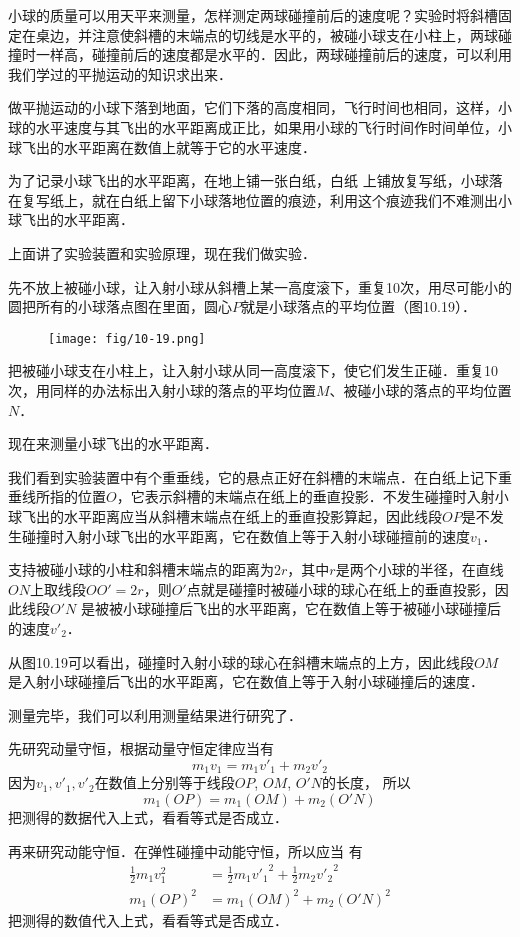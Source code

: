 小球的质量可以用天平来测量，怎样测定两球碰撞前后的速度呢？实验时将斜槽固定在桌边，并注意使斜槽的末端点的切线是水平的，被碰小球支在小柱上，两球碰撞时一样高，碰撞前后的速度都是水平的．因此，两球碰撞前后的速度，可以利用我们学过的平抛运动的知识求出来．

做平抛运动的小球下落到地面，它们下落的高度相同，飞行时间也相同，这样，小球的水平速度与其飞出的水平距离成正比，如果用小球的飞行时间作时间单位，小球飞出的水平距离在数值上就等于它的水平速度．

为了记录小球飞出的水平距离，在地上铺一张白纸，白纸
上铺放复写纸，小球落在复写纸上，就在白纸上留下小球落地位置的痕迹，利用这个痕迹我们不难测出小球飞出的水平距离．

上面讲了实验装置和实验原理，现在我们做实验．

先不放上被碰小球，让入射小球从斜槽上某一高度滚下，重复10次，用尽可能小的圆把所有的小球落点图在里面，圆心$P$就是小球落点的平均位置（图10.19）．
\begin{figure}[htp]
    \centering
    \texttt{[image: fig/10-19.png]}
    \caption{}
\end{figure}

把被碰小球支在小柱上，让入射小球从同一高度滚下，使它们发生正碰．重复10次，用同样的办法标出入射小球的落点的平均位置$M$、被碰小球的落点的平均位置$N$．

现在来测量小球飞出的水平距离．

我们看到实验装置中有个重垂线，它的悬点正好在斜槽的末端点．在白纸上记下重垂线所指的位置$O$，它表示斜槽的末端点在纸上的垂直投影．不发生碰撞时入射小球飞出的水平距离应当从斜槽末端点在纸上的垂直投影算起，因此线段$OP$是不发生碰撞时入射小球飞出的水平距离，它在数值上等于入射小球碰擅前的速度$v_1$．

支持被碰小球的小柱和斜槽末端点的距离为$2r$，其中$r$是两个小球的半径，在直线$ON$上取线段$OO'=2r$，则$O'$点就是碰撞时被碰小球的球心在纸上的垂直投影，因此线段$O'N$ 是被被小球碰撞后飞出的水平距离，它在数值上等于被碰小球碰撞后的速度$v'_2$．

从图10.19可以看出，碰撞时入射小球的球心在斜槽末端点的上方，因此线段$OM$是入射小球碰撞后飞出的水平距离，它在数值上等于入射小球碰撞后的速度．

测量完毕，我们可以利用测量结果进行研究了．

先研究动量守恒，根据动量守恒定律应当有
\[m_1v_1=m_1v'_1+m_2v'_2 \]
因为$v_1, v'_1,v'_2$在数值上分别等于线段$OP$, $OM$, $O'N$的长度，
所以
\[m_1(OP)=m_1(OM)+m_2(O'N)\]
把测得的数据代入上式，看看等式是否成立．

再来研究动能守恒．在弹性碰撞中动能守恒，所以应当
有
\[\begin{split}
    \frac{1}{2}m_1v_1^2&=\frac{1}{2}m_1{v'_1}^2+\frac{1}{2}m_2{v'_2}^2\\
    m_1(OP)^2&=m_1(OM)^2+m_2(O'N)^2
\end{split}\]
把测得的数值代入上式，看看等式是否成立．

